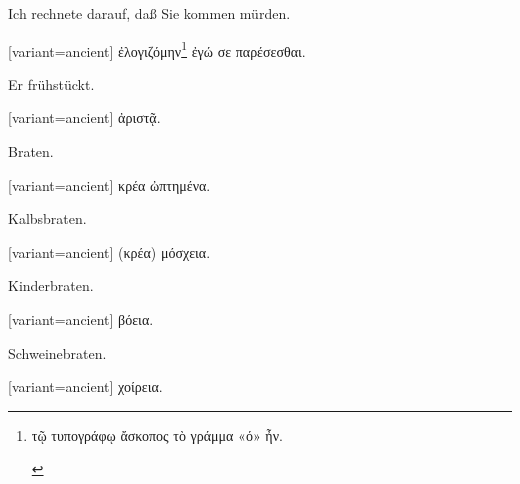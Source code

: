 Ich rechnete darauf, daß Sie kommen mürden.

\switchcolumn

\begin{greek}[variant=ancient]%
ἐλογιζόμην\footnote{\begin{latin}%
\textgreek[variant=ancient]{τῷ τυπογράφῳ ἄσκοπος τὸ γράμμα «ό» ἦν.}\end{latin}%
} ἐγώ σε παρέσεσθαι.

\end{greek}%
\switchcolumn*

Er frühstückt.

\switchcolumn

\begin{greek}[variant=ancient]%
ἀριστᾷ.

\end{greek}%
\switchcolumn*

\myafterpagetrue{}Braten. 

\switchcolumn

\begin{greek}[variant=ancient]%
κρέα ὠπτημένα.

\end{greek}%
\switchcolumn*\bgroup{} Kalbs\textcompwordmark{}braten.

\egroup\switchcolumn\bgroup

\begin{greek}[variant=ancient]%
(κρέα) μόσχεια.

\end{greek}%
\egroup\switchcolumn*\bgroup

Kinderbraten. 

\egroup\switchcolumn\bgroup

\begin{greek}[variant=ancient]%
βόεια.

\end{greek}%
\egroup\switchcolumn*\bgroup

Schweinebraten. 

\egroup\switchcolumn\bgroup

\begin{greek}[variant=ancient]%
χοίρεια.

\end{greek}%
\egroup\switchcolumn*\bgroup

